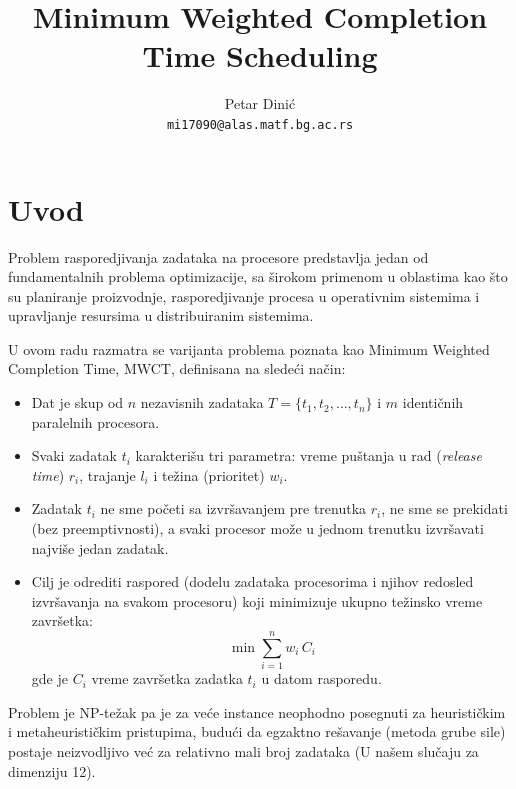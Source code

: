 \documentclass{article}
\begin{document}
\title{\Huge Minimum Weighted Completion Time Scheduling}
\author{
Petar Dinić\\
\texttt{mi17090@alas.matf.bg.ac.rs}
}
\date{}

\maketitle

\tableofcontents

\newpage

\section{Uvod}
Problem rasporedjivanja zadataka na procesore predstavlja jedan od
fundamentalnih problema optimizacije, sa širokom primenom u
oblastima kao što su planiranje proizvodnje, rasporedjivanje procesa u
operativnim sistemima i upravljanje resursima u distribuiranim sistemima.

U ovom radu razmatra se varijanta problema poznata kao Minimum
Weighted Completion Time, MWCT, definisana na sledeći način:

\begin{itemize}
    \item Dat je skup od $n$ nezavisnih zadataka $T = \{t_1, t_2, \dots, t_n\}$
        i $m$ identičnih paralelnih procesora.
    \item Svaki zadatak $t_i$ karakterišu tri parametra: vreme puštanja u rad
        (\textit{release time}) $r_i$, trajanje $l_i$ i težina (prioritet)
        $w_i$.
    \item Zadatak $t_i$ ne sme početi sa izvršavanjem pre trenutka $r_i$, ne
        sme se prekidati (bez preemptivnosti), a svaki procesor može u
        jednom trenutku izvršavati najviše jedan zadatak.
    \item Cilj je odrediti raspored (dodelu zadataka procesorima i njihov
        redosled izvršavanja na svakom procesoru) koji minimizuje ukupno
        težinsko vreme završetka:
        \[
            \min \sum_{i=1}^{n} w_i \, C_i
        \]
        gde je $C_i$ vreme završetka zadatka $t_i$ u datom rasporedu.
\end{itemize}

Problem je NP-težak pa je za veće instance neophodno posegnuti za heurističkim i
metaheurističkim pristupima, budući da egzaktno rešavanje (metoda grube sile)
postaje neizvodljivo već za relativno mali broj zadataka (U našem slučaju za dimenziju 12).
\end{document}
